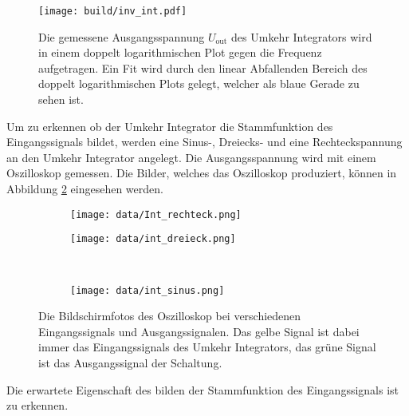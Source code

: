 \begin{figure}
    \centering
    \texttt{[image: build/inv\_int.pdf]}
    \caption{Die gemessene Ausgangsspannung $U_\text{out}$ des Umkehr Integrators wird in einem doppelt logarithmischen Plot gegen die Frequenz aufgetragen.
    Ein Fit wird durch den linear Abfallenden Bereich des doppelt logarithmischen Plots gelegt, welcher als blaue Gerade zu sehen ist.}
    \label{fig:inv_int}
\end{figure}

Um zu erkennen ob der Umkehr Integrator die Stammfunktion des Eingangssignals bildet, werden eine Sinus-, Dreiecks- und eine Rechteckspannung an den Umkehr Integrator angelegt.
Die Ausgangsspannung wird mit einem Oszilloskop gemessen.
Die Bilder, welches das Oszilloskop produziert, können in Abbildung \ref{fig:umkehr_oszi} eingesehen werden.
\begin{figure}
    \centering
    \begin{subfigure}{0.49\linewidth}%
        \texttt{[image: data/Int\_rechteck.png]}
    \end{subfigure}
    \hfill
    \begin{subfigure}{0.49\linewidth}%
        \texttt{[image: data/int\_dreieck.png]}
    \end{subfigure}\\
    \begin{subfigure}{0.49\linewidth}%
        \texttt{[image: data/int\_sinus.png]}
    \end{subfigure}
    \caption{Die Bildschirmfotos des Oszilloskop bei verschiedenen Eingangssignals und Ausgangssignalen.
    Das gelbe Signal ist dabei immer das Eingangssignals des Umkehr Integrators, das grüne Signal ist das Ausgangssignal der Schaltung.}
    \label{fig:umkehr_oszi}
\end{figure}
Die erwartete Eigenschaft des bilden der Stammfunktion des Eingangssignals ist zu erkennen.
\FloatBarrier
